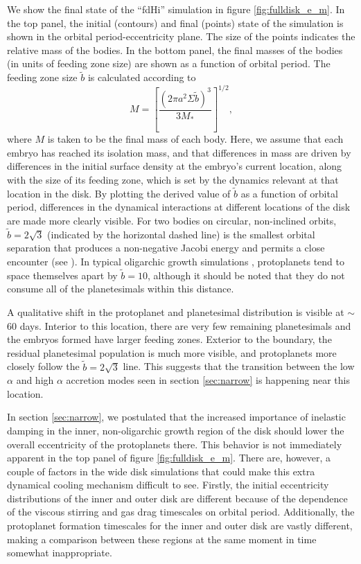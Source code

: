 \documentclass[twocolumn,linenumbers]{aastex63}
\begin{document}
We show the final state of the ``fdHi'' simulation in figure \ref{fig:fulldisk_e_m}. In the top panel,
the initial (contours) and final (points) state of the simulation is
shown in the orbital period-eccentricity plane. The size of the points
indicates the relative mass of the bodies. In the bottom panel, the
final masses of the bodies (in units of feeding zone size) are shown
as a function of orbital period. The feeding zone size $\tilde{b}$ is
calculated according to \citet{kokubo02}
\begin{equation}\label{eq:iso}
	M = \left[ \frac{\left( 2 \pi a^2 \Sigma \tilde{b} \right)^3}{3 M_{*}} \right]^{1/2},
\end{equation}
where $M$ is taken to be the final mass of each body. Here, we assume that each embryo has reached its isolation mass, and 
that differences in mass are driven by differences in the initial surface density at the embryo's current location, along with the 
size of its feeding zone, which is set by the dynamics relevant at that location in the disk. By plotting the derived value of $
\tilde{b}$ as a function of orbital period, differences in the dynamical interactions at different locations of the disk are made more 
clearly visible. For two bodies on circular, non-inclined orbits,  $\tilde{b} = 2
\sqrt{3}$ (indicated by the horizontal dashed line) is the smallest orbital separation that produces a non-negative Jacobi energy
and permits a close encounter (see \citet{naka88}). In typical oligarchic growth simulations \citep{kokubo98}, protoplanets tend 
to space themselves apart by $\tilde{b} = 10$, although it should be noted that they do not consume all of the planetesimals 
within this distance.

A qualitative shift in the protoplanet and planetesimal distribution is visible at $\sim$ 60 days. Interior to this location, there are 
very few remaining planetesimals and the embryos formed have larger feeding zones. Exterior to the boundary, the residual 
planetesimal population is much more visible, and protoplanets more closely follow the $\tilde{b} = 2 \sqrt{3}$ line. This 
suggests that the transition between the low $\alpha$ and high $\alpha$ accretion modes seen in section \ref{sec:narrow} 
is happening near this location.

In section \ref{sec:narrow}, we postulated that the increased importance of inelastic damping in the inner, non-oligarchic growth 
region of the disk should lower the overall eccentricity of the protoplanets there. This behavior is not immediately apparent in the 
top panel of figure \ref{fig:fulldisk_e_m}. There are, however, a couple of factors in the wide disk simulations that could make this 
extra dynamical cooling mechanism difficult to see. Firstly, the initial eccentricity distributions of the inner and outer disk are 
different because of the dependence of the viscous stirring and gas drag timescales on orbital period. Additionally, the 
protoplanet formation timescales for the inner and outer disk are vastly different, making a comparison between these regions at 
the same moment in time somewhat inappropriate.
\end{document}
